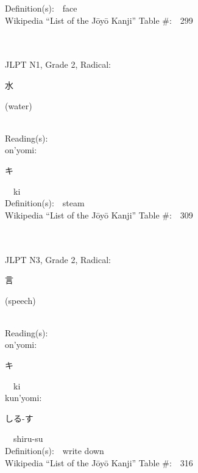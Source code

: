 \begin{multicols}{2}
Definition(s):\ \ face \\
Wikipedia ``List of the J\=oy\=o Kanji'' Table \#:\ \ 299 \\
\ \ \\
{\fontsize{34pt}{40pt}  }\ \ \\  %
{JLPT N1, Grade 2, Radical:\ \ {\begin{CJK}{UTF8}{min} 水 \end{CJK}} (water) } \\
Reading(s):\ \ \\
{\hspace*{1em}}on'yomi:\ \ \\
{\hspace*{2em}}{\begin{CJK}{UTF8}{min} キ \end{CJK}}\ \ ki\ \ \\
Definition(s):\ \ steam \\
Wikipedia ``List of the J\=oy\=o Kanji'' Table \#:\ \ 309 \\
\ \ \\
{\fontsize{34pt}{40pt}  }\ \ \\  %
{JLPT N3, Grade 2, Radical:\ \ {\begin{CJK}{UTF8}{min} 言 \end{CJK}} (speech) } \\
Reading(s):\ \ \\
{\hspace*{1em}}on'yomi:\ \ \\
{\hspace*{2em}}{\begin{CJK}{UTF8}{min} キ \end{CJK}}\ \ ki\ \ \\
{\hspace*{1em}}kun'yomi:\ \ \\
{\hspace*{2em}}{\begin{CJK}{UTF8}{min} しる-す \end{CJK}}\ \ shiru-su\ \ \\
Definition(s):\ \ write down \\
Wikipedia ``List of the J\=oy\=o Kanji'' Table \#:\ \ 316 \\

\end{multicols}
